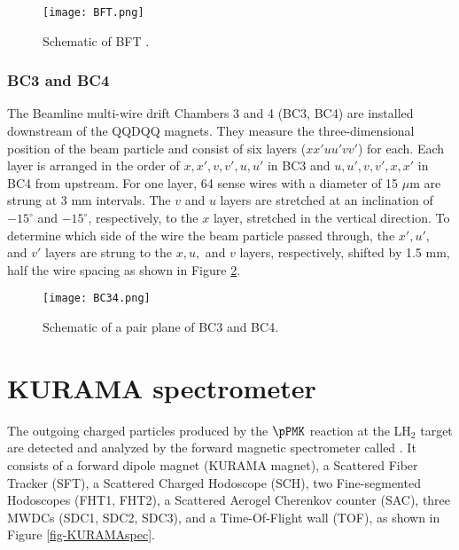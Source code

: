 \begin{figure}[!h]
 \begin{center}
   \texttt{[image: BFT.png]}
   \caption{Schematic of BFT \cite{Honda-D}.}
   \label{fig-BFT}
 \end{center}
\end{figure}

%
\subsubsection{BC3 and BC4}
The Beamline multi-wire drift Chambers 3 and 4 (BC3, BC4) are installed downstream of the QQDQQ magnets. They measure the three-dimensional position of the beam particle and consist of six layers ($xx'uu'vv'$) for each. Each layer is arranged in the order of $x, x', v, v', u, u'$ in BC3 and $u, u', v, v', x, x'$ in BC4 from upstream. For one layer, 64 sense wires with a diameter of 15 $\mu$m are strung at 3 mm intervals. The $v$ and $u$ layers are stretched at an inclination of $-15^{\circ}$ and $-15^{\circ}$, respectively, to the $x$ layer, stretched in the vertical direction. To determine which side of the wire the beam particle passed through, the $x', u',$ and $v'$ layers are strung to the $x, u,$ and $v$ layers, respectively, shifted by 1.5 mm, half the wire spacing as shown in Figure \ref{fig-BC34}.

\begin{figure}[!h]
 \begin{center}
   \texttt{[image: BC34.png]}
   \caption{Schematic of a pair plane of BC3 and BC4.}
   \label{fig-BC34}
 \end{center}
\end{figure}


\clearpage
\section{KURAMA spectrometer}
The outgoing charged particles produced by the $\pPMK$ reaction at the LH$_2$ target are detected and analyzed by the forward magnetic spectrometer called . It consists of a forward dipole magnet (KURAMA magnet), a Scattered Fiber Tracker (SFT), a Scattered Charged Hodoscope (SCH), two Fine-segmented Hodoscopes (FHT1, FHT2), a Scattered Aerogel Cherenkov counter (SAC), three MWDCs (SDC1, SDC2, SDC3), and a Time-Of-Flight wall (TOF), as shown in Figure \ref{fig-KURAMAspec}.

